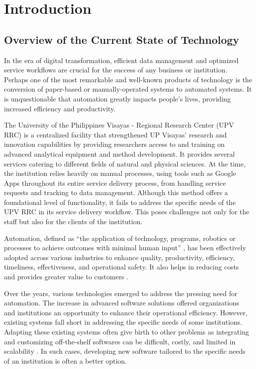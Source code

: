 \chapter{Introduction}
\label{sec:researchdesc}    %

\section{Overview of the Current State of Technology}
\label{sec:overview}


In the era of digital transformation, efficient data management and optimized service workflows are crucial for the success of any business or institution. Perhaps one of the most remarkable and well-known products of technology is the conversion of paper-based or manually-operated systems to automated systems. It is unquestionable that automation greatly impacts people's lives, providing increased efficiency and productivity.

The University of the Philippines Visayas - Regional Research Center (UPV RRC) is a centralized facility that strengthened UP Visayas’ research and innovation capabilities by providing researchers access to and training on advanced analytical equipment and method development. It provides several services catering to different fields of natural and physical sciences. At the time, the institution relies heavily on manual processes, using tools such as Google Apps throughout its entire service delivery process, from handling service requests and tracking to data management. Although this method offers a foundational level of functionality, it fails to address the specific needs of the UPV RRC in its service delivery workflow. This poses challenges not only for the staff but also for the clients of the institution.

Automation, defined as “the application of technology, programs, robotics or processes to achieve outcomes with minimal human input” \cite{ibm}, has been effectively adopted across various industries to enhance quality, productivity, efficiency, timeliness, effectiveness, and operational safety. It also helps in reducing costs and provides greater value to customers \cite{caban2021}. 

Over the years, various technologies emerged to address the pressing need for automation. The increase in advanced software solutions offered organizations and institutions an opportunity to enhance their operational efficiency. However, existing systems fall short in addressing the specific needs of some institutions. Adapting these existing systems often give birth to other problems as integrating and customizing off-the-shelf softwares can be difficult, costly, and limited in scalability \cite{bitcat2023}. In such cases, developing new software tailored to the specific needs of an institution is often a better option.

